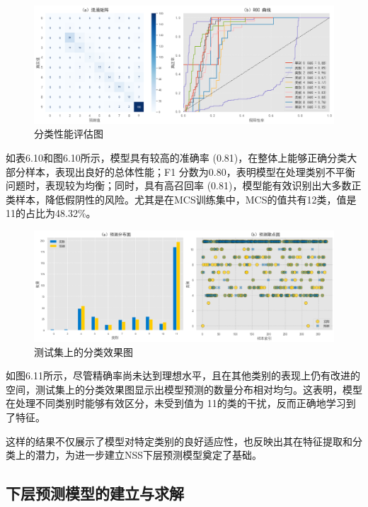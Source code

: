 \documentclass[bwprint]{gmcmthesis}
\begin{document}
\begin{figure}[H]
	\centering
	\includegraphics[width=1\linewidth]{figures/问题21预测结果图}
	\caption{分类性能评估图}
	\label{fig:21}
\end{figure}

如表6.10和图6.10所示，模型具有较高的准确率 (0.81)，在整体上能够正确分类大部分样本，表现出良好的总体性能；F1 分数为0.80，表明模型在处理类别不平衡问题时，表现较为均衡；同时，具有高召回率 (0.81)，模型能有效识别出大多数正类样本，降低假阴性的风险。尤其是在MCS训练集中，MCS的值共有12类，值是11的占比为48.32\%。

\begin{figure}[H]
	\centering
	\includegraphics[width=1\linewidth]{"figures/问题22预测结果png (2)"}
	\caption{测试集上的分类效果图}
	\label{fig:22png-2}
\end{figure}


如图6.11所示，尽管精确率尚未达到理想水平，且在其他类别的表现上仍有改进的空间，测试集上的分类效果图显示出模型预测的数量分布相对均匀。这表明，模型在处理不同类别时能够有效区分，未受到值为 11的类的干扰，反而正确地学习到了特征。

这样的结果不仅展示了模型对特定类别的良好适应性，也反映出其在特征提取和分类上的潜力，为进一步建立NSS下层预测模型奠定了基础。



\subsection{下层预测模型的建立与求解}
\end{document}
